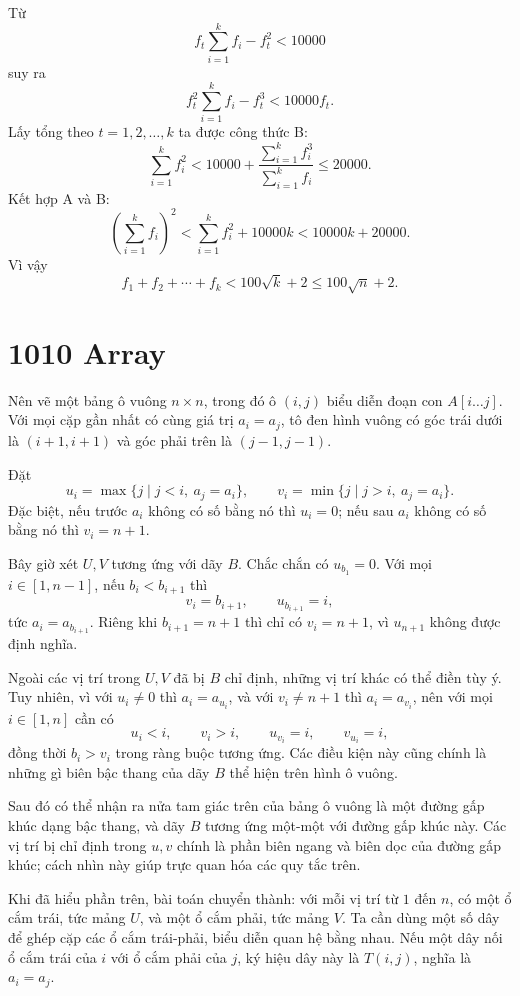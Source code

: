 \documentclass[11pt]{article}
\begin{document}
Từ
\[
  f_t\sum_{i=1}^{k}f_i-f_t^2<10000
\]
suy ra
\[
  f_t^2\sum_{i=1}^{k}f_i-f_t^3<10000f_t.
\]
Lấy tổng theo $t=1,2,\ldots,k$ ta được công thức B:
\[
  \sum_{i=1}^{k} f_i^2
  < 10000+\frac{\sum_{i=1}^{k}f_i^3}{\sum_{i=1}^{k}f_i}
  \le 20000.
\]
Kết hợp A và B:
\[
  \left(\sum_{i=1}^{k}f_i\right)^2
  < \sum_{i=1}^{k}f_i^2+10000k
  < 10000k+20000.
\]
Vì vậy
\[
  f_1+f_2+\cdots+f_k
  < 100\sqrt{k}+2
  \le 100\sqrt n+2.
\]

\section{1010 Array}

Nên vẽ một bảng ô vuông $n\times n$, trong đó ô $(i,j)$ biểu diễn đoạn con
$A[i\ldots j]$. Với mọi cặp gần nhất có cùng giá trị $a_i=a_j$, tô đen hình
vuông có góc trái dưới là $(i+1,i+1)$ và góc phải trên là $(j-1,j-1)$.

Đặt
\[
  u_i=\max\{j\mid j<i,\ a_j=a_i\},\qquad
  v_i=\min\{j\mid j>i,\ a_j=a_i\}.
\]
Đặc biệt, nếu trước $a_i$ không có số bằng nó thì $u_i=0$; nếu sau $a_i$
không có số bằng nó thì $v_i=n+1$.

Bây giờ xét $U,V$ tương ứng với dãy $B$. Chắc chắn có $u_{b_1}=0$. Với mọi
$i\in [1,n-1]$, nếu $b_i<b_{i+1}$ thì
\[
  v_i=b_{i+1},\qquad u_{b_{i+1}}=i,
\]
tức $a_i=a_{b_{i+1}}$. Riêng khi $b_{i+1}=n+1$ thì chỉ có $v_i=n+1$, vì
$u_{n+1}$ không được định nghĩa.

Ngoài các vị trí trong $U,V$ đã bị $B$ chỉ định, những vị trí khác có thể
điền tùy ý. Tuy nhiên, vì với $u_i\ne 0$ thì $a_i=a_{u_i}$, và với
$v_i\ne n+1$ thì $a_i=a_{v_i}$, nên với mọi $i\in[1,n]$ cần có
\[
  u_i<i,\qquad v_i>i,\qquad u_{v_i}=i,\qquad v_{u_i}=i,
\]
đồng thời $b_i>v_i$ trong ràng buộc tương ứng. Các điều kiện này cũng chính
là những gì biên bậc thang của dãy $B$ thể hiện trên hình ô vuông.

Sau đó có thể nhận ra nửa tam giác trên của bảng ô vuông là một đường gấp
khúc dạng bậc thang, và dãy $B$ tương ứng một-một với đường gấp khúc này.
Các vị trí bị chỉ định trong $u,v$ chính là phần biên ngang và biên dọc của
đường gấp khúc; cách nhìn này giúp trực quan hóa các quy tắc trên.

Khi đã hiểu phần trên, bài toán chuyển thành: với mỗi vị trí từ $1$ đến $n$,
có một ổ cắm trái, tức mảng $U$, và một ổ cắm phải, tức mảng $V$. Ta cần dùng
một số dây để ghép cặp các ổ cắm trái-phải, biểu diễn quan hệ bằng nhau. Nếu
một dây nối ổ cắm trái của $i$ với ổ cắm phải của $j$, ký hiệu dây này là
$T(i,j)$, nghĩa là $a_i=a_j$.
\end{document}
